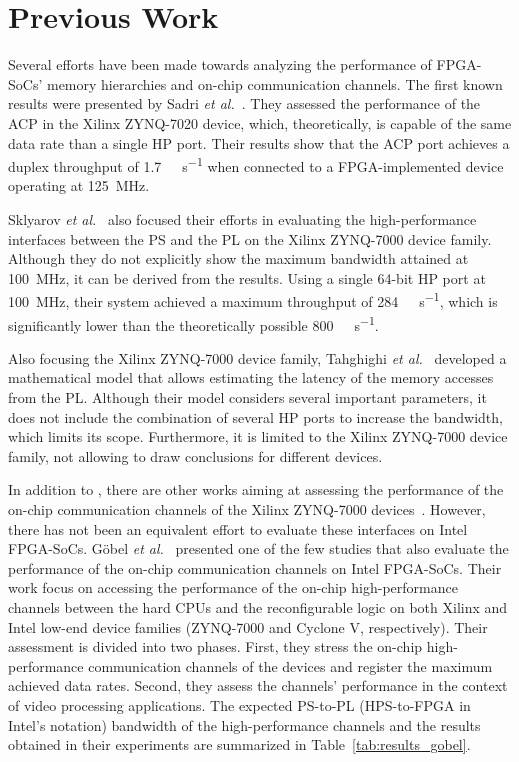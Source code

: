 \section{Previous Work}\label{sec:previous_work}

Several efforts have been made towards analyzing the performance of \ac{FPGA}-\acp{SoC}' memory hierarchies and on-chip communication channels. The first known results were presented by Sadri \textit{et al.}~\cite{sadri2013energy}. They assessed the performance of the \ac{ACP} in the Xilinx ZYNQ-7020 device, which, theoretically, is capable of the same data rate than a single \ac{HP} port. Their results show that the \ac{ACP} port achieves a duplex throughput of \SI{1.7}{\giga\byte\per\second} when connected to a \ac{FPGA}-implemented device operating at \SI{125}{\mega\hertz}.

Sklyarov \textit{et al.}~\cite{DBLP:conf/dsd/SklyarovSSS15} also focused their efforts in evaluating the high-performance interfaces between the \ac{PS} and the \ac{PL} on the Xilinx ZYNQ-7000 device family. Although they do not explicitly show the maximum bandwidth attained at \SI{100}{\mega\hertz}, it can be derived from the results. Using a single 64-bit \ac{HP} port at \SI{100}{\mega\hertz}, their system achieved a maximum throughput of \SI{284}{\mega\byte\per\second}, which is significantly lower than the theoretically possible \SI{800}{\mega\byte\per\second}.

Also focusing the Xilinx ZYNQ-7000 device family, Tahghighi \textit{et al.}~\cite{tahghighi2016analytical} developed a mathematical model that allows estimating the latency of the memory accesses from the \ac{PL}. Although their model considers several important parameters, it does not include the combination of several \ac{HP} ports to increase the bandwidth, which limits its scope. Furthermore, it is limited to the Xilinx ZYNQ-7000 device family, not allowing to draw conclusions for different devices.

In addition to \cite{sadri2013energy,DBLP:conf/dsd/SklyarovSSS15,tahghighi2016analytical}, there are other works aiming at assessing the performance of the on-chip communication channels of the Xilinx ZYNQ-7000 devices~\cite{svensson2016exploring}. However, there has not been an equivalent effort to evaluate these interfaces on Intel \ac{FPGA}-\acp{SoC}. G{\"{o}}bel \textit{et al.}~\cite{DBLP:conf/arc/GobelECMJ17} presented one of the few studies that also evaluate the performance of the on-chip communication channels on Intel \ac{FPGA}-\acp{SoC}. Their work focus on accessing the performance of the on-chip high-performance channels between the hard \acp{CPU} and the reconfigurable logic on both Xilinx and Intel low-end device families (ZYNQ-7000 and Cyclone V, respectively). Their assessment is divided into two phases. First, they stress the on-chip high-performance communication channels of the devices and register the maximum achieved data rates. Second, they assess the channels' performance in the context of video processing applications. The expected \ac{PS}-to-\ac{PL} (\ac{HPS}-to-\ac{FPGA} in Intel's notation) bandwidth of the high-performance channels and the results obtained in their experiments are summarized in Table~\ref{tab:results_gobel}.

